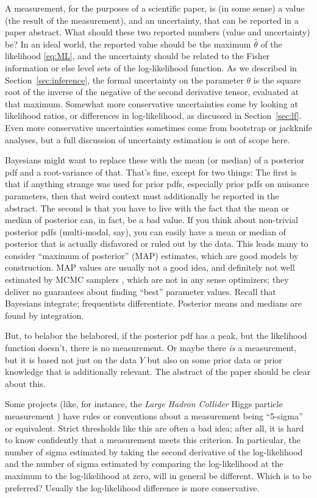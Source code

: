 \documentclass{article}
\newcommand{\sectionname}{Section}
\newcommand{\secref}[1]{\sectionname~\ref{#1}}
\begin{document}
A measurement, for the purposes of a scientific paper, is (in some sense) a value (the result of the measurement), and an uncertainty, that can be reported in a paper abstract.
What should these two reported numbers (value and uncertainty) be?
In an ideal world, the reported value should be the maximum $\hat\theta$ of the likelihood \eqref{eq:ML}, and the uncertainty should be related to the Fisher information or else level sets of the log-likelihood function.
As we described in \secref{sec:inference}, the formal uncertainty on the parameter $\theta$ is the square root of the inverse of the negative of the second derivative tensor, evaluated at that maximum.
Somewhat more conservative uncertainties come by looking at likelihood ratios, or differences in log-likelihood, as discussed in \secref{sec:lf}.
Even more conservative uncertainties sometimes come from bootstrap \cite{bootstrap} or jackknife \cite{jackknife} analyses, but a full discussion of uncertainty estimation is out of scope here.

Bayesians might want to replace these with the mean (or median) of a posterior pdf and a root-variance of that.
That's fine, except for two things:
The first is that if anything strange was used for prior pdfs, especially prior pdfs on nuisance parameters, then that weird context must additionally be reported in the abstract.
The second is that you have to live with the fact that the mean or median of posterior can, in fact, be a bad value.
If you think about non-trivial posterior pdfs (multi-modal, say), you can easily have a mean or median of posterior that is actually disfavored or ruled out by the data.
This leads many to consider ``maximum of posterior'' (MAP) estimates, which are good models by construction.
MAP values are usually not a good idea, and definitely not well estimated by MCMC samplers \cite{mcmc}, which are not in any sense optimizers; they deliver no guarantees about finding ``best'' parameter values.
Recall that Bayesians integrate; frequentists differentiate.
Posterior means and medians are found by integration.

But, to belabor the belabored, if the posterior pdf has a peak, but the likelihood function doesn't, there is no measurement.
Or maybe there \emph{is} a measurement, but it is based not just on the data $Y$ but also on some prior data or prior knowledge that is additionally relevant.
The abstract of the paper should be clear about this.

Some projects (like, for instance, the \textsl{Large Hadron Collider} Higgs particle measurement \cite{lhc}) have rules or conventions about a measurement being ``5-sigma'' or equivalent.
Strict thresholds like this are often a bad idea; after all, it is hard to know confidently that a measurement meets this criterion.
In particular, the number of sigma estimated by taking the second derivative of the log-likelihood and the number of sigma estimated by comparing the log-likelihood at the maximum to the log-likelihood at zero, will in general be different.
Which is to be preferred?
Usually the log-likelihood difference is more conservative.
\end{document}

